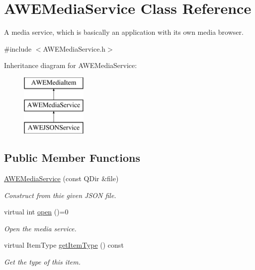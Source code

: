 \hypertarget{class_a_w_e_media_service}{\section{A\-W\-E\-Media\-Service Class Reference}
\label{class_a_w_e_media_service}
}


A media service, which is basically an application with its own media browser.  




{\ttfamily \#include $<$A\-W\-E\-Media\-Service.\-h$>$}

Inheritance diagram for A\-W\-E\-Media\-Service\-:\begin{figure}[H]
\begin{center}
\leavevmode
\includegraphics[height=3.000000cm]{class_a_w_e_media_service}
\end{center}
\end{figure}
\subsection*{Public Member Functions}
\begin{DoxyCompactItemize}
\item 
\hyperlink{class_a_w_e_media_service_a2fe98e713aae885e87683eaf7bfe3af6}{A\-W\-E\-Media\-Service} (const Q\-Dir \&file)
\begin{DoxyCompactList}\small\item\em Construct from thie given J\-S\-O\-N file. \end{DoxyCompactList}\item 
virtual int \hyperlink{class_a_w_e_media_service_a3020cd2f0707a78005ab2ee6279ed122}{open} ()=0
\begin{DoxyCompactList}\small\item\em Open the media service. \end{DoxyCompactList}\item 
virtual Item\-Type \hyperlink{class_a_w_e_media_service_a2f381f8b3d0dd1d9284e14d14704879b}{get\-Item\-Type} () const 
\begin{DoxyCompactList}\small\item\em Get the type of this item. \end{DoxyCompactList}\end{DoxyCompactItemize}
